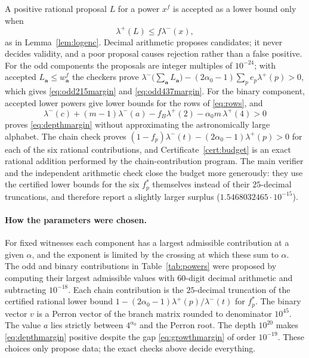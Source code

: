 \documentclass[11pt]{article}
\theoremstyle{definition}
\theoremstyle{remark}
\newcommand{\al}{\alpha_0}
\begin{document}
A positive rational proposal $L$ for a power $x^f$ is accepted as a lower
bound only when
\begin{equation}\label{eq:poweraccept}
 \lambda^+(L)\le f\lambda^-(x),
\end{equation}
as in Lemma~\ref{lem:logenc}. Decimal arithmetic proposes candidates; it
never decides validity, and a poor proposal causes rejection rather than a
false positive. For the odd components the proposals are integer multiples of
$10^{-24}$; with accepted $L_{\mathbf a}\le w_{\mathbf a}^f$ the checkers prove
$\lambda^-\bigl(\sum_{\mathbf a}L_{\mathbf a}\bigr)-(2\al-1)\sum_pe_p\lambda^+(p)>0$, which gives
\eqref{eq:odd215margin} and \eqref{eq:odd437margin}. For the binary component,
accepted lower powers give lower bounds for the rows of \eqref{eq:rows}, and
\[
 \lambda^-(c)+(m-1)\lambda^-(a)-f_B\lambda^+(2)-\al m\,\lambda^+(4)>0
\]
proves \eqref{eq:depthmargin} without approximating the astronomically large
alphabet. The chain check proves $(1-f_p)\lambda^-(t)-(2\al-1)\lambda^+(p)>0$ for each
of the six rational contributions, and Certificate~\ref{cert:budget} is an
exact rational addition performed by the chain-contribution program. The main
verifier and the independent arithmetic check close the budget more
generously: they use the certified lower bounds for the six $f_p^*$ themselves
instead of their $25$-decimal truncations, and therefore report a slightly
larger surplus ($1.5468032465\cdot10^{-15}$).

\paragraph{How the parameters were chosen.} For fixed witnesses each
component has a largest admissible contribution at a given $\alpha$, and the
exponent is limited by the crossing at which these sum to $\alpha$. The
odd and binary contributions in Table~\ref{tab:powers} were proposed by
computing their largest admissible values with 60-digit decimal arithmetic and
subtracting $10^{-18}$. Each chain contribution is the $25$-decimal truncation
of the certified rational lower bound
$1-(2\al-1)\lambda^+(p)/\lambda^-(t)$ for $f_p^*$. The binary
vector $v$ is a Perron vector of the branch matrix rounded to denominator
$10^{45}$. The value $a$ lies strictly between $4^{\al}$ and the Perron
root. The depth $10^{20}$ makes \eqref{eq:depthmargin} positive despite the
gap \eqref{eq:growthmargin} of order $10^{-19}$. These choices only propose
data; the exact checks above decide everything.
\end{document}
